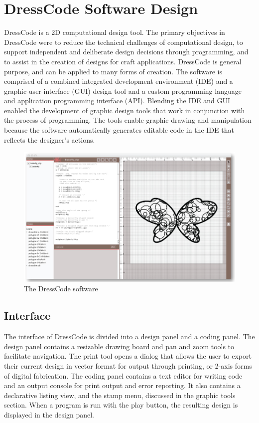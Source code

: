 \documentclass{sigchi}
\begin{document}
\section{DressCode Software Design}
DressCode is a 2D computational design tool. The primary objectives in DressCode were to reduce the technical challenges of computational design, to support independent and deliberate design decisions through programming, and to assist in the creation of designs for craft applications. DressCode is general purpose, and can be applied to many forms of creation. The software is comprised of a combined integrated development environment (IDE) and a graphic-user-interface (GUI) design tool and a custom programming language and application programming interface (API). Blending the IDE and GUI enabled the development of graphic design tools that work in conjunction with the process of programming. The tools enable graphic drawing and manipulation because the software automatically generates editable code in the IDE that reflects the designer's actions.

\begin{center}
\begin{figure}[h!]
\includegraphics[width=\columnwidth]{images/dresscode_interface.jpg}
\caption{The DressCode software}
\label{fig:dresscode_interface}
\end{figure}
\end{center}
\vspace{-20pt}
\subsection{Interface}
The interface of DressCode is divided into a design panel and a coding panel. The design panel contains a resizable drawing board and pan and zoom tools to facilitate navigation. The print tool opens a dialog that allows the user to export their current design in vector format for output through printing, or 2-axis forms of digital fabrication. The coding panel contains a text editor for writing code and an output console for print output and error reporting. It also contains a declarative listing view, and the stamp menu, discussed in the graphic tools section. When a program is run with the play button, the resulting design is displayed in the design panel.
\end{document}
